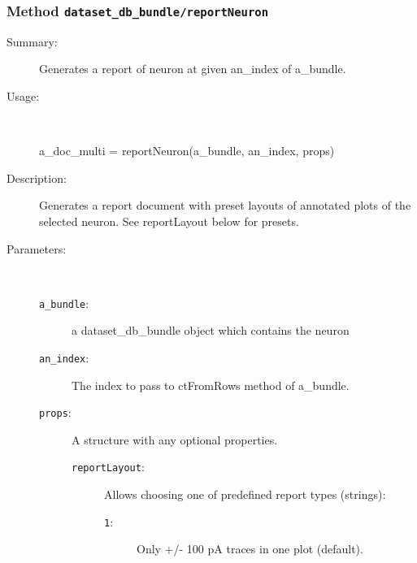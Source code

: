 \subsubsection[Method \texttt{reportNeuron}]{Method \texttt{dataset\_db\_bundle/reportNeuron}}%
%
\label{ref_dataset_db_bundle__reportNeuron}%
\hypertarget{ref_dataset_db_bundle__reportNeuron}{}%
\begin{description}
\item[Summary:]Generates a report of neuron at given an\_index of a\_bundle.
%
\item[Usage:]~%
\begin{lyxcode}%
a\_doc\_multi = reportNeuron(a\_bundle, an\_index, props)
%
\end{lyxcode}%
%
\item[Description:]%
Generates a report document with preset layouts of annotated plots of
 the selected neuron. See reportLayout below for presets.
\item[Parameters:]~
\begin{description}%
\item[\texttt{a\_bundle}:]
 a dataset\_db\_bundle object which contains the neuron
\item[\texttt{an\_index}:]
 The index to pass to ctFromRows method of a\_bundle.
\item[\texttt{props}:]
 A structure with any optional properties.
\begin{description}%
\item[\texttt{reportLayout}:]
 Allows choosing one of predefined report types (strings):
\begin{description}%
\item[\texttt{1}:]
 Only +/- 100 pA traces in one plot (default).


\end{description}
\end{description}
\end{description}
\end{description}

